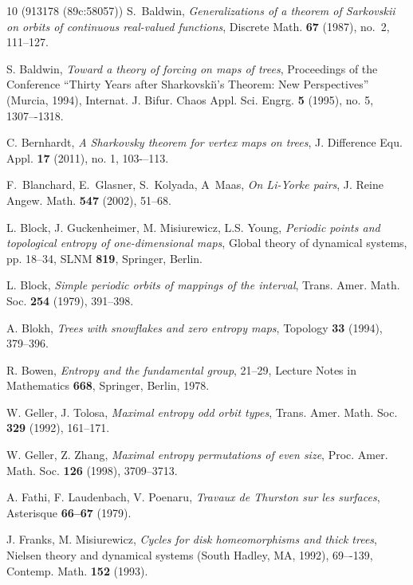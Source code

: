 \documentclass[a4paper]{amsart}
\theoremstyle{definition}
\begin{document}
\begin{thebibliography}{10}
 (913178 (89c:58057))
S.~Baldwin, \emph{Generalizations of a theorem of {S}arkovskii on
orbits of continuous real-valued functions}, Discrete Math. \textbf{67}
(1987), no.~2, 111--127.

S. Baldwin, \emph{Toward a theory of forcing on maps of trees}, Proceedings of the
Conference ``Thirty Years after Sharkovski\u\i's Theorem: New Perspectives''
(Murcia, 1994), Internat. J. Bifur. Chaos Appl. Sci. Engrg. {\bf 5} (1995), no. 5,
1307–-1318.

C. Bernhardt, \emph{A Sharkovsky theorem for vertex maps on trees}, J. Difference Equ. Appl. {\bf 17} (2011), no. 1, 103-–113.

F.~Blanchard, E.~Glasner, S.~Kolyada, A~Maas, \emph{On Li-Yorke pairs}, J. Reine Angew. Math. {\bf 547} (2002), 51--68.

L. Block, J. Guckenheimer, M. Misiurewicz, L.S. Young, \emph{Periodic
points and topological entropy of one-dimensional maps}, Global theory
of dynamical systems, pp. 18--34, SLNM {\bf 819}, Springer, Berlin.

L. Block, \emph{Simple periodic orbits of mappings of the
interval}, Trans. Amer. Math. Soc. \textbf{254} (1979), 391--398.

A. Blokh, \emph{Trees with snowflakes and zero entropy maps},
Topology \textbf{33} (1994), 379--396.


R. Bowen, \emph{Entropy and the fundamental group}, 21--29, Lecture Notes in Mathematics
{\bf 668}, Springer, Berlin, 1978.

W. Geller, J. Tolosa, \emph{Maximal entropy odd orbit types}, Trans. Amer. Math. Soc. \textbf{329} (1992), 161--171.

W. Geller, Z. Zhang, \emph{Maximal entropy permutations of even size}, Proc. Amer. Math. Soc. \textbf{126} (1998), 3709--3713.

A. Fathi, F. Laudenbach, V. Poenaru, \emph{Travaux de Thurston sur les surfaces}, Asterisque {\bf 66--67} (1979).

J. Franks, M. Misiurewicz, \emph{Cycles for disk homeomorphisms and thick trees},
Nielsen theory and dynamical systems (South Hadley, MA, 1992), 69–-139, Contemp. Math. {\bf 152} (1993).


\end{thebibliography}
\end{document}
